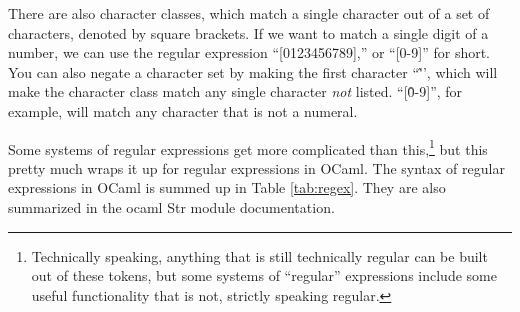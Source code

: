 \documentclass[10pt]{book}
\begin{document}
{There are also character classes, which match a single character out
of a set of characters, denoted by square brackets. If we want to
match a single digit of a number, we can use the regular expression
``[0123456789],'' or ``[0-9]'' for short. You can also negate a
character set by making the first character ``\^'', which will make
the character class match any single character {\em not}
listed. ``[\^0-9]'', for example, will match any character that is not
a numeral.

Some systems of regular expressions get more complicated than this,\footnote{Technically speaking, anything that is still technically regular can be built out of these tokens, but some systems of ``regular'' expressions include some useful functionality that is not, strictly speaking regular.} but this pretty much wraps it up for regular expressions in OCaml. The syntax of regular expressions in OCaml is summed up in Table \ref{tab:regex}. They are also summarized in the ocaml Str module documentation.

}
\end{document}
